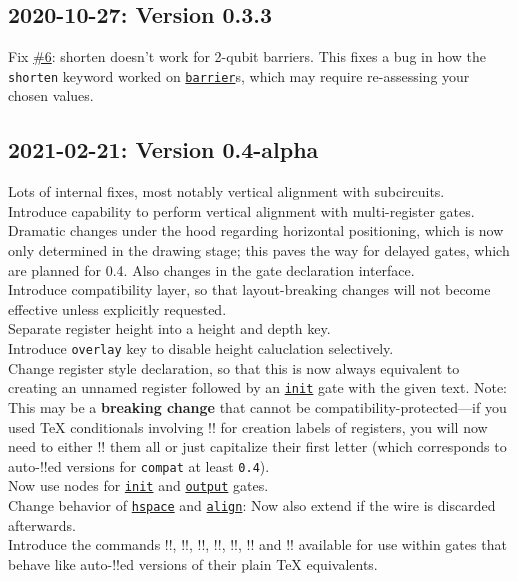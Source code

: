 \documentclass{scrartcl}
\def\gate#1{\hyperref[gate:#1]{\texttt{#1}}}
\begin{document}
      \subsection*{2020-10-27: Version 0.3.3}
         Fix \href{https://github.com/projekter/yquant/issues/6}{\#6}: shorten doesn't work for 2-qubit barriers. This fixes a bug in how the \texttt{shorten} keyword worked on \gate{barrier}s, which may require re\hyp assessing your chosen values.

      \subsection*{2021-02-21: Version 0.4-alpha}
         Lots of internal fixes, most notably vertical alignment with subcircuits. \\
         Introduce capability to perform vertical alignment with multi\hyp register gates. \\
         Dramatic changes under the hood regarding horizontal positioning, which is now only determined in the drawing stage; this paves the way for delayed gates, which are planned for 0.4.
         Also changes in the gate declaration interface. \\
         Introduce compatibility layer, so that layout\hyp breaking changes will not become effective unless explicitly requested. \\
         Separate register height into a height and depth key. \\
         Introduce \texttt{overlay} key to disable height caluclation selectively. \\
         Change register style declaration, so that this is now always equivalent to creating an unnamed register followed by an \gate{init} gate with the given text.
         Note: This may be a \textbf{breaking change} that cannot be compatibility\hyp protected---if you used \TeX{} conditionals involving \tex!\idx! for creation labels of registers, you will now need to either \tex!\protect! them all or just capitalize their first letter (which corresponds to auto\hyp\tex!\protect!ed versions for \texttt{compat} at least \texttt{0.4}). \\
         Now use nodes for \gate{init} and \gate{output} gates. \\
         Change behavior of \gate{hspace} and \gate{align}: Now also extend if the wire is discarded afterwards. \\
         Introduce the commands \tex!\Ifnum!, \tex!\Ifcase!, \tex!\Or!, \tex!\Else!, \tex!\Fi!, \tex!\Unless! and \tex!\The! available for use within gates that behave like auto\hyp\tex!\protect!ed versions of their plain \TeX{} equivalents.
\end{document}
